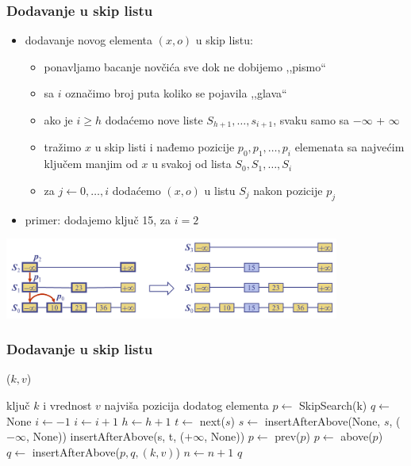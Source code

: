 \documentclass[compress]{beamer}
\renewcommand{\algorithmiccomment}[1]{\hfill \{\myred{#1}\}}
\begin{document}
\begin{frame}[fragile]
  \frametitle{Dodavanje u skip listu}
  \begin{itemize}
    \item dodavanje novog elementa $(x, o)$ u skip listu:
    \begin{itemize}
      \item ponavljamo bacanje novčića sve dok ne dobijemo ,,pismo``
      \item sa $i$ označimo broj puta koliko se pojavila ,,glava``
      \item ako je $i \geq h$ dodaćemo nove liste $S_{h+1}, \ldots, s_{i+1}$, svaku samo sa $-\infty$ + $\infty$
      \item tražimo $x$ u skip listi i nađemo pozicije $p_0, p_1, \ldots, p_i$ elemenata sa najvećim ključem manjim od $x$ u svakoj od lista $S_0, S_1, \ldots, S_i$
      \item za $j\leftarrow 0, \ldots, i$ dodaćemo $(x, o)$ u listu $S_j$ nakon pozicije $p_j$
    \end{itemize}
    \item primer: dodajemo ključ 15, za $i=2$ 
  \end{itemize}
  \begin{center}
    \includegraphics[width=11cm]{asp-10-pic13.png}
  \end{center}
\end{frame}

\renewcommand{\algorithmiccomment}[1]{\hfill \{\myred{#1}\}}

\begin{frame}
\frametitle{Dodavanje u skip listu}
($k, v$)
\begin{algorithmic}
\REQUIRE ključ $k$ i vrednost $v$
\ENSURE najviša pozicija dodatog elementa
\STATE $p \leftarrow$ SkipSearch(k)
\STATE $q \leftarrow$ None 
\STATE $i \leftarrow -1$
\REPEAT
  \STATE $i\leftarrow i+1$
    \STATE $h \leftarrow h + 1$ 
    \STATE $t \leftarrow$ next($s$)
    \STATE $s \leftarrow$ insertAfterAbove(None, $s$, ($-\infty$, None)) 
    \STATE insertAfterAbove(s, t, ($+\infty$, None)) 
  \ENDIF
    \STATE $p \leftarrow$ prev($p$) 
  \ENDWHILE
  \STATE $p \leftarrow$ above($p$) 
  \STATE $q \leftarrow$ insertAfterAbove($p,q,(k,v)$) 
\STATE $n \leftarrow n + 1$
\RETURN $q$
\end{algorithmic}
\end{frame}
\end{document}
